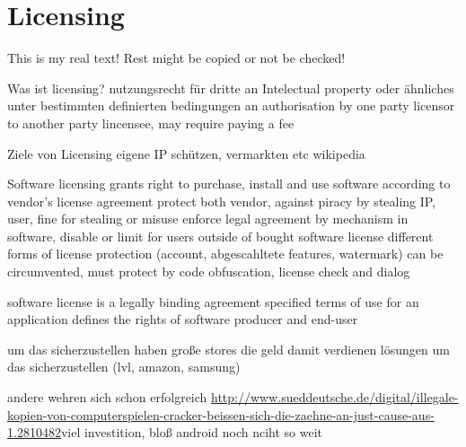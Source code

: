 \section{Licensing} \label{section:introduction-licensing}
This is my real text! Rest might be copied or not be checked!


%
Was ist licensing?
nutzungsrecht für dritte an Intelectual property oder ähnliches unter bestimmten definierten bedingungen
an authorisation by one party licensor to another party lincensee, may require paying a fee

Ziele von Licensing
eigene IP schützen, vermarkten etc
wikipedia
%

%
Software licensing grants right to purchase, install and use software according to vendor's license agreement
protect both vendor, against piracy by stealing IP, user, fine for stealing or misuse
enforce legal agreement by mechanism in software, disable or limit for users outside of bought software license
different forms of license protection (account, abgescahltete features, watermark)
can be circumvented, must protect by code obfuscation, license check and dialog
\cite{munteanLicense}
%

%
software license is a legally binding agreement
specified terms of use for an application
defines the rights of software producer and end-user
\cite{uncgLicensing}
%



um das sicherzustellen haben große stores die geld damit verdienen lösungen um das sicherzustellen (lvl, amazon, samsung)


andere wehren sich schon erfolgreich \url{http://www.sueddeutsche.de/digital/illegale-kopien-von-computerspielen-cracker-beissen-sich-die-zaehne-an-just-cause-aus-1.2810482}viel investition, bloß android noch nciht so weit
